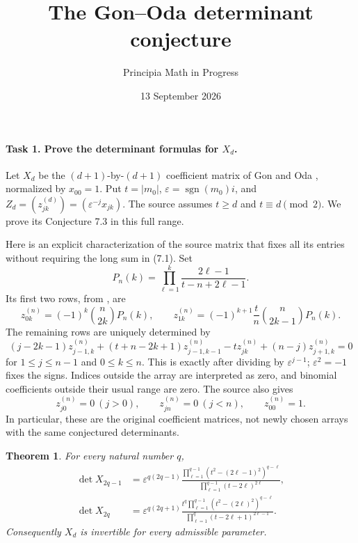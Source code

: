\documentclass[10pt]{article}
\title{The Gon--Oda determinant conjecture}
\author{Principia Math in Progress}
\date{13 September 2026}
\newtheorem{theorem}{Theorem}
\begin{document}
\maketitle

\paragraph{Task 1. Prove the determinant formulas for \(X_d\).}
Let \(X_d\) be the \((d+1)\)-by-\((d+1)\) coefficient matrix of
Gon and Oda \cite[(7.1)]{GO}, normalized by \(x_{00}=1\).
Put \(t=|m_0|\), \(\varepsilon=\operatorname{sgn}(m_0)i\), and
\(Z_d=(z^{(d)}_{jk})=(\varepsilon^{-j}x_{jk})\).
The source assumes \(t\ge d\) and \(t\equiv d\pmod2\).
We prove its Conjecture 7.3 in this full range.

Here is an explicit characterization of the source matrix that fixes
all its entries without requiring the long sum in (7.1). Set
\[
 P_n(k)=\prod_{\ell=1}^k\frac{2\ell-1}{t-n+2\ell-1}.
\]
Its first two rows, from \cite[(6.19)--(6.20)]{GO}, are
\begin{equation}\label{initial}
 z^{(n)}_{0k}=(-1)^k\binom n{2k}P_n(k),\qquad
 z^{(n)}_{1k}=(-1)^{k+1}\frac tn\binom n{2k-1}P_n(k).
\end{equation}
The remaining rows are uniquely determined by
\begin{equation}\label{rec}
 (j-2k-1)z^{(n)}_{j-1,k}+(t+n-2k+1)z^{(n)}_{j-1,k-1}
 -tz^{(n)}_{jk}+(n-j)z^{(n)}_{j+1,k}=0
\end{equation}
for \(1\le j\le n-1\) and \(0\le k\le n\).
This is exactly \cite[(6.13)]{GO} after dividing by
\(\varepsilon^{j-1}\); \(\varepsilon^2=-1\) fixes the signs.
Indices outside the array are interpreted as zero, and binomial
coefficients outside their usual range are zero. The source also gives
\begin{equation}\label{edges}
 z^{(n)}_{j0}=0\ (j>0),\qquad z^{(n)}_{jn}=0\ (j<n),\qquad
 z^{(n)}_{00}=1.
\end{equation}
In particular, these are the original coefficient matrices, not newly
chosen arrays with the same conjectured determinants.

\begin{theorem}\label{main}
For every natural number \(q\),
\begin{align*}
 \det X_{2q-1}
 &=\varepsilon^{q(2q-1)}
 \frac{\prod_{\ell=1}^{q-1}(t^2-(2\ell-1)^2)^{q-\ell}}
      {\prod_{\ell=1}^{q-1}(t-2\ell)^{2\ell}},\\
 \det X_{2q}
 &=\varepsilon^{q(2q+1)}
 \frac{t^q\prod_{\ell=1}^{q-1}(t^2-(2\ell)^2)^{q-\ell}}
      {\prod_{\ell=1}^{q}(t-2\ell+1)^{2\ell-1}}.
\end{align*}
Consequently \(X_d\) is invertible for every admissible parameter.
\end{theorem}
\end{document}
